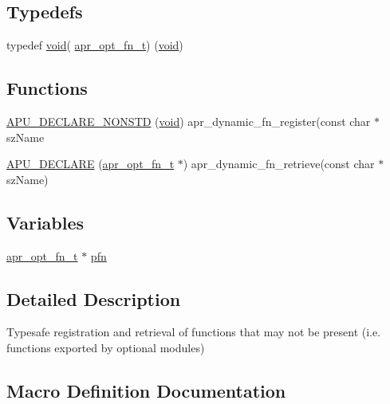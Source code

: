 \subsection*{Typedefs}
\begin{DoxyCompactItemize}
\item 
typedef \hyperlink{group__MOD__ISAPI_gacd6cdbf73df3d9eed42fa493d9b621a6}{void}( \hyperlink{group__APR__Util__Opt_ga7254f2a8e1bff8d81cf437f870e963d8}{apr\+\_\+opt\+\_\+fn\+\_\+t}) (\hyperlink{group__MOD__ISAPI_gacd6cdbf73df3d9eed42fa493d9b621a6}{void})
\end{DoxyCompactItemize}
\subsection*{Functions}
\begin{DoxyCompactItemize}
\item 
\hyperlink{group__APR__Util__Opt_ga8455bf03588491b03eabffec63a270b5}{A\+P\+U\+\_\+\+D\+E\+C\+L\+A\+R\+E\+\_\+\+N\+O\+N\+S\+TD} (\hyperlink{group__MOD__ISAPI_gacd6cdbf73df3d9eed42fa493d9b621a6}{void}) apr\+\_\+dynamic\+\_\+fn\+\_\+register(const char $\ast$sz\+Name
\item 
\hyperlink{group__APR__Util__Opt_ga77b4d143df9f27cac699f8c5644c6f7d}{A\+P\+U\+\_\+\+D\+E\+C\+L\+A\+RE} (\hyperlink{group__APR__Util__Opt_ga7254f2a8e1bff8d81cf437f870e963d8}{apr\+\_\+opt\+\_\+fn\+\_\+t} $\ast$) apr\+\_\+dynamic\+\_\+fn\+\_\+retrieve(const char $\ast$sz\+Name)
\end{DoxyCompactItemize}
\subsection*{Variables}
\begin{DoxyCompactItemize}
\item 
\hyperlink{group__APR__Util__Opt_ga7254f2a8e1bff8d81cf437f870e963d8}{apr\+\_\+opt\+\_\+fn\+\_\+t} $\ast$ \hyperlink{group__APR__Util__Opt_gaeb58c2c559f0a385ac570471c8d43298}{pfn}
\end{DoxyCompactItemize}


\subsection{Detailed Description}
Typesafe registration and retrieval of functions that may not be present (i.\+e. functions exported by optional modules) 

\subsection{Macro Definition Documentation}
